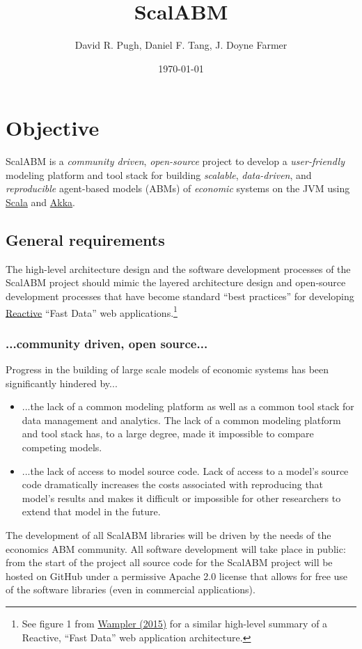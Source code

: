 \documentclass[11pt]{amsart}
\title{ScalABM}
\author{David R. Pugh, Daniel F. Tang, J. Doyne Farmer}
\date{\today}
\begin{document}
\maketitle

\section{Objective}
ScalABM is a \textit{community driven}, \textit{open-source} project to develop a \textit{user-friendly} modeling platform and tool stack for building \textit{scalable}, \textit{data-driven}, and \textit{reproducible} agent-based models (ABMs) of \textit{economic} systems on the JVM using \href{http://www.scala-lang.org/}{Scala} and \href{http://akka.io/}{Akka}.

\subsection{General requirements}
The high-level architecture design and the software development processes of the ScalABM project should mimic the layered architecture design and open-source development processes that have become standard ``best practices'' for developing \href{http://www.reactivemanifesto.org/}{Reactive} ``Fast Data'' web applications.\footnote{
%
See figure 1 from \href{./fast-data-big-data-evolved.pdf}{Wampler (2015)} for a similar high-level summary of a Reactive, ``Fast Data'' web application architecture.
%
}
\subsubsection{...community driven, open source...}
Progress in the building of large scale models of economic systems has been significantly hindered by...
\begin{itemize}
    \item ...the lack of a common modeling platform as well as a common tool stack for data management and analytics. The lack of a common modeling platform and tool stack has, to a large degree, made it impossible to compare competing models. 
    \item ...the lack of access to model source code. Lack of access to a model's source code dramatically increases the costs associated with reproducing that model's results and makes it difficult or impossible for other researchers to extend that model in the future.
\end{itemize}

The development of all ScalABM libraries will be driven by the needs of the economics ABM community. All software development will take place in public: from the start of the project all source code for the ScalABM project will be hosted on GitHub under a permissive Apache 2.0 license that allows for free use of the software libraries (even in commercial applications).
\end{document}
